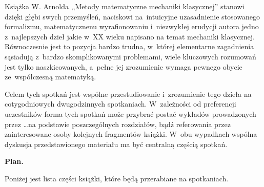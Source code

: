 \documentclass[a4paper,11pt]{article}
\begin{document}
Książka W. Arnolda ,,Metody matematyczne mechaniki klasycznej''
stanowi dzięki głębi swych przemyśleń, naciskowi na~intuicyjne
uzasadnienie stosowanego formalizmu, matematycznenu wyrafionowaniu
i~niezwykłej erudycji autora jedno z~najlepszych dzieł jakie w~XX
wieku napisano na temat mechaniki klasycznej. Równoczesnie jest to
pozycja bardzo trudna, w~której elementarne zagadnienia sąsiadują
z~bardzo skomplikowanymi problemami, wiele kluczowych rozumowań jest
tylko naszkicowanych, a~pełne jej zrozumienie wymaga pewnego obycie
ze~współczesną matematyką.

Celem tych spotkań jest wspólne przestudiowanie i~zrozumienie tego
dzieła na cotygodniowych dwugodzinnych spotkaniach. W~zależności od
preferencji uczestników forma tych spotkań może przybrać postać
wykładów prowadzonych przez \ldots na podstawie poszczególnych
rozdziałów, bądź referowania przez zainteresowane osoby kolejnych
fragmentów książki. W~obu wypadkach wspólna dyskusja przedstawionego
materiału ma być centralną częścią spotkań.

\begin{center}

  \Large{\textbf{Plan.}}

\end{center}

\noindent
Poniżej jest lista części książki, które będą przerabiane na
spotkaniach.
\end{document}

